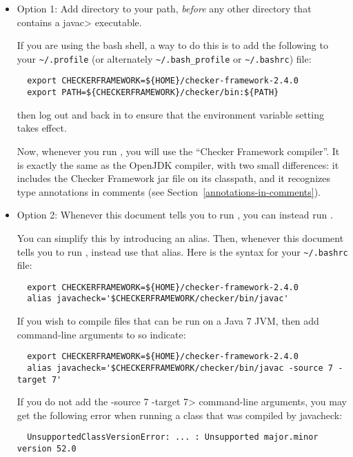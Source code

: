 \begin{itemize}
  \item
    Option 1:
    Add directory
     to your path, \emph{before} any other
    directory that contains a \<javac> executable.

    If you are
    using the bash shell, a way to do this is to add the following to your
    \verb|~/.profile| (or alternately \verb|~/.bash_profile| or \verb|~/.bashrc|) file:
\begin{Verbatim}
  export CHECKERFRAMEWORK=${HOME}/checker-framework-2.4.0
  export PATH=${CHECKERFRAMEWORK}/checker/bin:${PATH}
\end{Verbatim}
    then log out and back in to ensure that the environment variable
    setting takes effect.

    Now, whenever you run , you will use the ``Checker
    Framework compiler''.  It is exactly the same as the OpenJDK compiler,
    with two small differences:  it includes the Checker Framework jar file
    on its classpath, and it recognizes type annotations in comments (see
    Section~\ref{annotations-in-comments}).

  \item
    \begin{sloppypar}
    Option 2:
    Whenever this document tells you to run , you
    can instead run .
    \end{sloppypar}

    You can simplify this by introducing an alias.  Then,
    whenever this document tells you to run , instead use that
    alias.  Here is the syntax for your
    \verb|~/.bashrc| file:
\begin{Verbatim}
  export CHECKERFRAMEWORK=${HOME}/checker-framework-2.4.0
  alias javacheck='$CHECKERFRAMEWORK/checker/bin/javac'
\end{Verbatim}

    If you wish to compile files that can be run on a Java 7 JVM, then add
    command-line arguments to so indicate:

\begin{Verbatim}
  export CHECKERFRAMEWORK=${HOME}/checker-framework-2.4.0
  alias javacheck='$CHECKERFRAMEWORK/checker/bin/javac -source 7 -target 7'
\end{Verbatim}

   If you do not add the \<-source 7 -target 7> command-line arguments, you
   may get the following error when running a class that was compiled by
   javacheck:
\begin{Verbatim}
  UnsupportedClassVersionError: ... : Unsupported major.minor version 52.0
\end{Verbatim}


\end{itemize}
